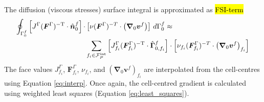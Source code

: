 \documentclass[sn-mathphys,Numbered]{sn-jnl}%
\newcommand{\bb}{\boldsymbol}
\begin{document}
The diffusion (viscous stresses) surface integral is approximated as \hl{FSI-term}
\begin{align}
	\oint_{\Gamma^f_0}  \left[ J^\Gamma (\bb{F}^\Gamma)^{-\text{T}} \cdot \hat{\bb{n}}_0^f \right]
		\cdot & \left[\nu (\bb{F}^\Gamma)^{-T} \cdot \left( \bb{\nabla}_0 \bb{v}^f \right) \right] \, d\Gamma^f_0
		\approx \notag \\
		& \sum_{f_i \in \mathcal{F}^{\text{int}}_P}
		\left[ J^\Gamma_{f_i} (\bb{F}^\Gamma_{f_i})^{-\text{T}} \cdot \hat{\bb{\Gamma}}_{0, f_i}^f \right]
			\cdot \left[\nu_{f_i} (\bb{F}^\Gamma_{f_i})^{-T} \cdot \left( \bb{\nabla}_0 \bb{v}^f \right)_{f_i} \right]
\end{align}
The face values $J^\Gamma_{f_i}$, $\bb{F}^\Gamma_{f_i}$, $\nu_{f_i}$, and $\left( \bb{\nabla}_0 \bb{v}^f \right)_{f_i} $ are interpolated from the cell-centres using Equation \ref{eq:interp}.
Once again, the cell-centred gradient is calculated using weighted least squares (Equation \ref{eq:least_squares}).
\end{document}
